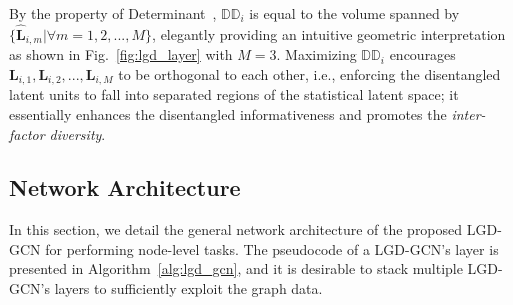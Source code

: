 \documentclass[accepted]{uai2021} %
\begin{document}
By the property of Determinant~\citep{Bernstein2005MatrixMT}, $\mathbb{DD}_i$ is equal to the volume spanned by $\{\hat{\mathbf{L}}_{i,m}|\forall m = 1,2,...,M\}$, elegantly providing an intuitive geometric interpretation as shown in Fig.~\ref{fig:lgd_layer} with $M=3$. Maximizing $\mathbb{DD}_i$ encourages $\mathbf{L}_{i,1}, \mathbf{L}_{i,2}, ..., \mathbf{L}_{i,M}$ to be orthogonal to each other, i.e., enforcing the disentangled latent units to fall into separated regions of the statistical latent space; it essentially enhances the disentangled informativeness and promotes the \emph{inter-factor diversity}.


\subsection{Network Architecture}
In this section, we detail the general network architecture of the proposed LGD-GCN for performing node-level tasks. The pseudocode of a LGD-GCN's layer is presented in Algorithm~\ref{alg:lgd_gcn}, and it is desirable to stack multiple LGD-GCN's layers to sufficiently exploit the graph data. 
\end{document}
